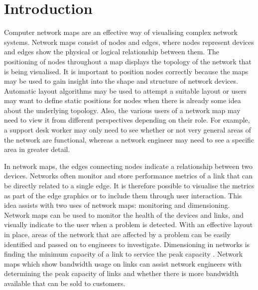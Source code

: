 \documentclass[11pt, a4paper]{report}
\begin{document}
\tableofcontents

\chapter{Introduction}
\label{sec:introduction}

\setcounter{page}{1}



Computer network maps are an effective way of visualising complex network
systems. Network maps consist of nodes and edges, where nodes represent devices
and edges show the physical or logical relationship between them. The
positioning of nodes throughout a map displays the topology of the network that
is being visualised. It is important to position nodes correctly because the
maps may be used to gain insight into the shape and structure of network
devices.  Automatic layout algorithms may be used to attempt a suitable layout or
users may want to define static positions for nodes when there is already some
idea about the underlying topology. Also, the various users of a network map may
need to view it from different perspectives depending on their role. For
example, a support desk worker may only need to see whether or not very general
areas of the network are functional, whereas a network engineer may need to see
a specific area in greater detail.

In network maps, the edges connecting nodes indicate a relationship between two
devices. Networks often monitor and store performance metrics of a link that can
be directly related to a single edge. It is therefore possible to visualise the
metrics as part of the edge graphics or to include them through user
interaction. This idea assists with two uses of network maps: monitoring and
dimensioning. Network maps can be used to monitor the health of the devices and
links, and visually indicate to the user when a problem is detected. With an
effective layout in place, areas of the network that are affected by a problem
can be easily identified and passed on to engineers to investigate. Dimensioning
in networks is finding the minimum capacity of a link to service the peak
capacity \cite{Girard_1990}. Network maps which show bandwidth usage on links
can assist network engineers with determining the peak capacity of links and
whether there is more bandwidth available that can be sold to customers.
\end{document}
